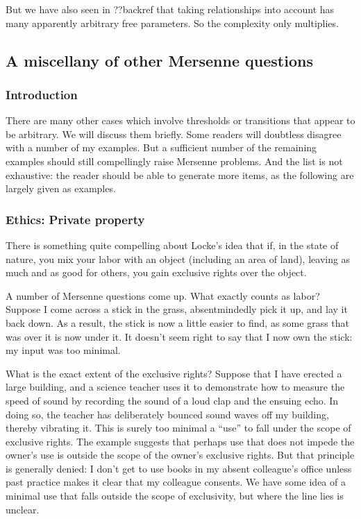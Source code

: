 But we have also seen in ??backref that taking relationships into account has many apparently arbitrary free parameters. So 
the complexity only multiplies.


\subsection{A miscellany of other Mersenne questions}
\subsubsection{Introduction}
There are many other cases which involve thresholds or transitions that appear to be arbitrary. We will discuss them briefly.
Some readers will doubtless disagree with a number of my examples. But a sufficient number of the remaining examples 
should still compellingly raise Mersenne problems. And the list is not
exhaustive: the reader should be able to generate more items, as the following are largely given as examples.

\subsubsection{Ethics: Private property}
There is something quite compelling about Locke's idea that if, in the state of nature, you mix your labor with 
an object (including an area of land), leaving as much and as good for others, you gain exclusive rights over 
the object. 

A number of Mersenne questions come up. What exactly counts as labor? Suppose I come across a stick in 
the grass, absentmindedly pick it up, and lay it back down. As a result, the stick is now a little easier to find, as 
some grass that was over it is now under it.  It doesn't seem right to say that I now own
the stick: my input was too minimal. 

What is the exact extent of the exclusive rights? Suppose that I have erected a large 
building, and a science teacher uses it to demonstrate how to measure the speed of sound by recording the sound of a loud 
clap and the ensuing echo. In doing so, the teacher has deliberately bounced sound waves off my building, thereby vibrating 
it. This is surely too minimal a ``use'' to fall under the scope of exclusive rights. The example suggests that perhaps use that 
does not impede the owner's use is outside the scope of the owner's exclusive rights. But that principle is generally 
denied: I don't get to use books in my absent colleague's office unless past practice makes it clear that my 
colleague consents. We have some idea of a minimal use that falls outside the scope of exclusivity, but where the 
line lies is unclear.

